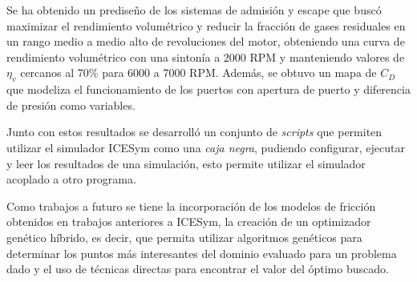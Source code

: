 Se ha obtenido un prediseño de los sistemas de admisión y escape que buscó
maximizar el rendimiento volumétrico y reducir la fracción de gases residuales
en un rango medio a medio alto de revoluciones del motor, obteniendo una curva
de rendimiento volumétrico con una sintonía a 2000 RPM y manteniendo valores de
$\eta_v$ cercanos al 70\% para 6000 a 7000 RPM.
%
Además, se obtuvo un mapa de $C_D$ que modeliza el funcionamiento de los
puertos con apertura de puerto y diferencia de presión como variables.

Junto con estos resultados se desarrolló un conjunto de \emph{scripts} que
permiten utilizar el simulador ICESym como una \emph{caja negra}, pudiendo
configurar, ejecutar y leer los resultados de una simulación, esto permite
utilizar el simulador acoplado a otro programa.

Como trabajos a futuro se tiene la incorporación de los modelos de fricción
obtenidos en trabajos anteriores\parencite{roldan} a ICESym, la creación de un
optimizador genético híbrido, es decir, que permita utilizar algoritmos
genéticos para determinar los puntos más interesantes del dominio evaluado para
un problema dado y el uso de técnicas directas para encontrar el valor del
óptimo buscado.
